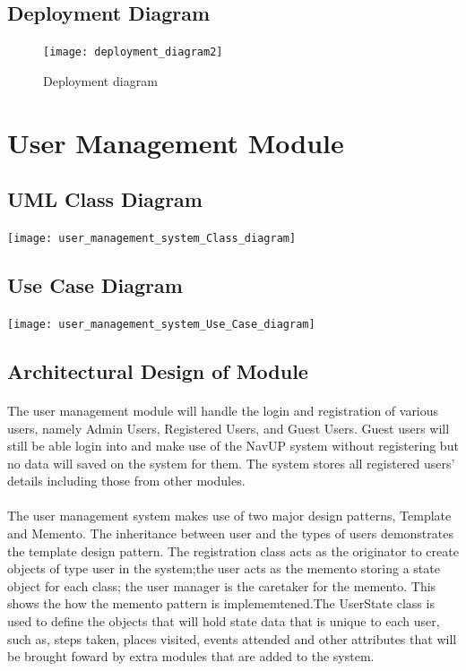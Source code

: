 \documentclass{article}
\begin{document}
\pagebreak
\subsection{Deployment Diagram}

\pagebreak
\begin{figure}
\texttt{[image: deployment\_diagram2]}
\caption{Deployment diagram}
\end{figure}

\section{User Management Module}

\subsection{UML Class Diagram}
\texttt{[image: user\_management\_system\_Class\_diagram]}


\subsection{Use Case Diagram}

\texttt{[image: user\_management\_system\_Use\_Case\_diagram]}

\subsection{Architectural Design of Module}
\paragraph{}The user management module will handle the login and registration of various users, namely Admin Users, Registered Users, and Guest Users. Guest users will still be able login into and make use of the NavUP system without registering but no data will saved on the system for them. The system stores all registered users' details including those from other modules.

\paragraph{}The user management system makes use of two major design patterns, Template and Memento. The inheritance between user and the types of users demonstrates the template design pattern. The registration class acts as the originator to create objects of type user in the system;the user acts as the memento storing a state object for each class; the user manager is the caretaker for the memento. This shows the how the memento pattern is implememtened.The UserState class is used to define the objects that will hold state data that is unique to each user, such as, steps taken, places visited, events attended and other attributes that will be brought foward by extra modules that are added to the system.
\end{document}
